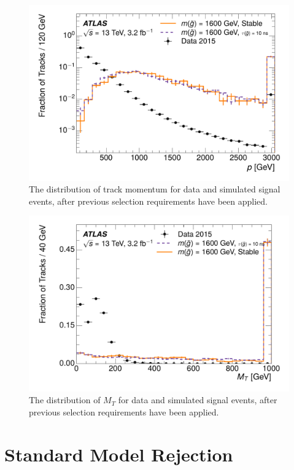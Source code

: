 \begin{figure}[h]
\centering
\includegraphics[width=\fullfig]{figures/selection_p_nm1.pdf}
\caption{The distribution of track momentum for data and simulated signal events, after previous selection requirements have been applied.}
\label{fig:nm1_p}
\end{figure}


\begin{figure}[h]
\centering
\includegraphics[width=\fullfig]{figures/selection_mt_nm1.pdf}
\caption{The distribution of $M_T$ for data and simulated signal events, after previous selection requirements have been applied.}
\label{fig:nm1_mt}
\end{figure}


\section{Standard Model Rejection}
\label{sec:sm_rejection}

